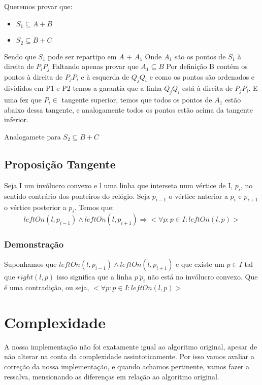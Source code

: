 \documentclass[11pt]{article}
\begin{document}
Queremos provar que:
\begin{itemize}
    \item $S_1 \subseteq A + B$
    \item $S_2 \subseteq B + C$
\end{itemize}

Sendo que $S_1$ pode ser repartipo em $A$ + $A_1$
\newline
Onde $A_1$ são os pontos de $S_1$ à direita de $P_iP_j$
\newline
Faltando apenas provar que $A_1 \subseteq B$ 
Por definição B contém os pontos à direita de $P_jP_i$ e à esquerda
de $Q_jQ_i$ e como os pontos são ordenados e divididos em P1 e P2
temos a garantia que a linha $Q_jQ_i$ está à direita de $P_jP_i$.
E uma fez que $P_i \in$ tangente superior, temos que todos os pontos
de $A_1$ estão abaixo dessa tangente, e analogamente todos os pontos
estão acima da tangente inferior.


Analogamete para $S_2 \subseteq B + C$

\subsection{Proposição Tangente}
Seja 
    I um invólucro convexo e 
    l uma linha que interseta num vértice de I, $p_i$,
no sentido contrário dos ponteiros do relógio.
Seja $p_{i-1}$ o vértice anterior a $p_i$ e $p_{i+1}$ o vértice posterior a $p_i$.
Temos que:
$$leftOn(l, p_{i-1}) \wedge leftOn(l, p_{i+1}) \Rightarrow
    <\forall p : p \in I : leftOn(l, p)>$$

\subsubsection{Demonstração}
Suponhamos que $leftOn(l, p_{i-1}) \wedge leftOn(l, p_{i+1})$ 
e que existe um $p \in I$ tal que $right(l, p)$
isso significa que a linha $\overline{p\ p_i}$ não está no invólucro convexo.
Que é uma contradição, ou seja, $<\forall p : p \in I : leftOn(l, p)>$



\section{Complexidade}
A nossa implementação não foi exatamente igual ao algoritmo original,
apesar de não alterar na conta da complexidade assintoticamente.
Por isso vamos avaliar a correção da nossa implementação, e quando 
achamos pertinente, vamos fazer a ressalva, mensionando as diferenças 
em relação ao algoritmo original.
\end{document}
